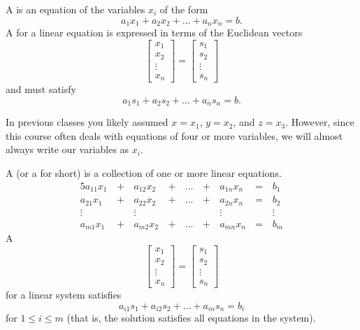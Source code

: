 
\begin{applicationActivities}

\begin{definition}
A  is an equation of the variables \(x_i\) of the form
\[
a_1x_1+a_2x_2+\dots+a_nx_n=b
.\]
A 
for a linear equation is expressed in terms of the Euclidean vectors
\[
  \begin{bmatrix}
    x_1 \\
    x_2 \\
    \vdots \\
    x_n
  \end{bmatrix}=
  \begin{bmatrix}
    s_1 \\
    s_2 \\
    \vdots \\
    s_n
  \end{bmatrix}
\]
and must satisfy
\[
a_1s_1+a_2s_2+\dots+a_ns_n=b
.\]
\end{definition}



\begin{remark}
In previous classes you likely assumed \(x=x_1\), \(y=x_2\), and \(z=x_3\).
However, since this course often deals with equations of four or more
variables, we will almost always write our variables as \(x_i\).
\end{remark}

\begin{definition}
A  (or a  for short)
is a collection of one or more linear equations.
  \begin{alignat*}{5}
    a_{11}x_1 &\,+\,& a_{12}x_2 &\,+\,& \dots  &\,+\,& a_{1n}x_n &\,=\,& b_1 \\
    a_{21}x_1 &\,+\,& a_{22}x_2 &\,+\,& \dots  &\,+\,& a_{2n}x_n &\,=\,& b_2 \\
     \vdots&  &\vdots&   &&  &\vdots&&\vdots  \\
    a_{m1}x_1 &\,+\,& a_{m2}x_2 &\,+\,& \dots  &\,+\,& a_{mn}x_n &\,=\,& b_m
  \end{alignat*}
A 
\[
  \begin{bmatrix}
    x_1 \\
    x_2 \\
    \vdots \\
    x_n
  \end{bmatrix}=
  \begin{bmatrix}
    s_1 \\
    s_2 \\
    \vdots \\
    s_n
  \end{bmatrix}
\]
for a linear system satisfies
\[
a_{i1}s_1+a_{i2}s_2+\dots+a_{in}s_n=b_i
\]
for \(1\leq i\leq m\) (that is, the solution satisfies all equations
in the system).
\end{definition}


\end{applicationActivities}
